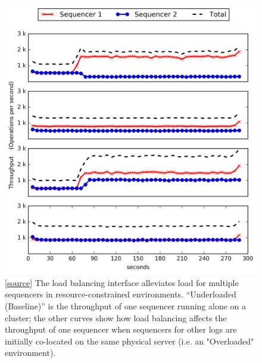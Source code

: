 \documentclass[preprint]{sigplanconf-eurosys}
\begin{document}
\begin{figure}[t!]
\centering
\includegraphics{figures/mantle-balancer-profiles.png}
\caption{[\href{https://github.com/double-blind-submitter/osdi16}{source}] The
load balancing interface alleviates load for multiple sequencers in
resource-constrained environments.  ``Underloaded (Baseline)'' is the
throughput of one sequencer running alone on a cluster; the other curves show
how load balancing affects the throughput of one sequencer when sequencers for
other logs are initially co-located on the same physical server (i.e. an
"Overloaded" environment).}\label{fig:mantle-seq-thruput}
\end{figure}
\end{document}
